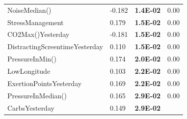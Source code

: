 \documentclass[conference]{IEEEtran}
\begin{document}
\begin{table}[]
\begin{tabular}{llll}
NoiseMedian()                  & -0.182 & \textbf{1.4E-02} & 0.00           \\
StressManagement               & 0.179  & \textbf{1.5E-02} & 0.00           \\
CO2Max()Yesterday              & -0.181 & \textbf{1.5E-02} & 0.00           \\
DistractingScreentimeYesterday & 0.110  & \textbf{1.5E-02} & 0.00           \\
PressureInMin()                & 0.174  & \textbf{2.0E-02} & 0.00           \\
LowLongitude                   & 0.103  & \textbf{2.2E-02} & 0.00           \\
ExertionPointsYesterday        & 0.169  & \textbf{2.2E-02} & 0.00           \\
PressureInMedian()             & 0.165  & \textbf{2.9E-02} & 0.00           \\
CarbsYesterday                 & 0.149  & \textbf{2.9E-02} &                \\
\end{tabular}
\end{table}
\end{document}
